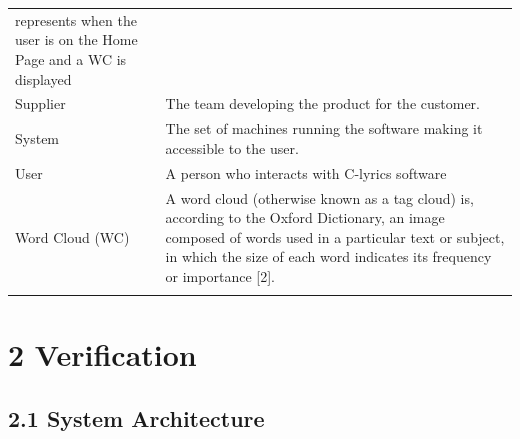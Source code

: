 \documentclass[]{article}
\begin{document}
\begin{longtable}[c]{@{}ll@{}}
\begin{minipage}[t]{0.47\columnwidth}
represents when the user is on the Home Page and a WC is displayed
\end{minipage}
\\\addlinespace
\begin{minipage}[t]{0.47\columnwidth}\raggedright
Supplier
\end{minipage} & \begin{minipage}[t]{0.47\columnwidth}\raggedright
The team developing the product for the customer.
\end{minipage}
\\\addlinespace
\begin{minipage}[t]{0.47\columnwidth}\raggedright
System
\end{minipage} & \begin{minipage}[t]{0.47\columnwidth}\raggedright
The set of machines running the software making it accessible to the
user.
\end{minipage}
\\\addlinespace
\begin{minipage}[t]{0.47\columnwidth}\raggedright
User
\end{minipage} & \begin{minipage}[t]{0.47\columnwidth}\raggedright
A person who interacts with C-lyrics software
\end{minipage}
\\\addlinespace
\begin{minipage}[t]{0.47\columnwidth}\raggedright
Word Cloud (WC)
\end{minipage} & \begin{minipage}[t]{0.47\columnwidth}\raggedright
A word cloud (otherwise known as a tag cloud) is, according to the
Oxford Dictionary, an image composed of words used in a particular text
or subject, in which the size of each word indicates its frequency or
importance {[}2{]}.
\end{minipage}
\\\addlinespace
\bottomrule
\end{longtable}


\section{2 Verification}\label{verification}

\subsection{2.1 System Architecture}\label{system-architecture}
\end{document}
